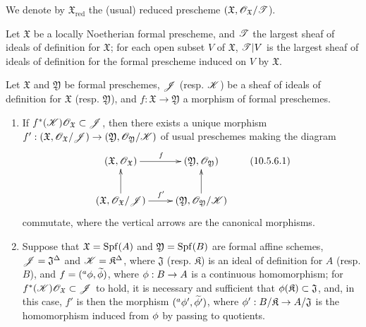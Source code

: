 We denote by $\mathfrak{X}_\text{red}$ the (usual) reduced prescheme $(\mathfrak{X},\mathscr{O}_\mathfrak{X}/\mathscr{T}$).

\begin{corollary}[10.5.5]
\label{1.10.5.5}
Let $\mathfrak{X}$ be a locally Noetherian formal prescheme, and $\mathscr{T}$ the largest sheaf of ideals of definition for $\mathfrak{X}$; for each open subset $V$ of $\mathfrak{X}$, $\mathscr{T}|V$ is the largest sheaf of ideals of definition for the formal prescheme induced on $V$ by $\mathfrak{X}$.
\end{corollary}

\begin{proposition}[10.5.6]
\label{1.10.5.6}
Let $\mathfrak{X}$ and $\mathfrak{Y}$ be formal preschemes, $\mathscr{J}$ (resp. $\mathscr{K}$) be a sheaf of ideals of definition for $\mathfrak{X}$ (resp. $\mathfrak{Y}$), and $f:\mathfrak{X}\to\mathfrak{Y}$ a morphism of formal preschemes.
\begin{enumerate}[label=\emph{(\roman*)}]
  \item If $f^*(\mathscr{K})\mathscr{O}_\mathfrak{X}\subset\mathscr{J}$, then there exists a unique morphism $f':(\mathfrak{X},\sh{O}_\mathfrak{X}/\sh{J})\to(\mathfrak{Y},\sh{O}_\mathfrak{Y}/\sh{K})$ of usual preschemes making the diagram
    \begin{equation*}
    \label{1.10.5.6.1}
      \xymatrix{
        (\mathfrak{X},\sh{O}_\mathfrak{X})\ar[r]^f &
        (\mathfrak{Y},\sh{O}_\mathfrak{Y})\\
        (\mathfrak{X},\sh{O}_\mathfrak{X}/\sh{J})\ar[r]^{f'}\ar[u] &
        (\mathfrak{Y},\sh{O}_\mathfrak{Y}/\sh{K})\ar[u]
      }
      \tag{10.5.6.1}
    \end{equation*}
    commutate, where the vertical arrows are the canonical morphisms.
  \item Suppose that $\mathfrak{X}=\operatorname{Spf}(A)$ and $\mathfrak{Y}=\operatorname{Spf}(B)$ are formal affine schemes, $\mathscr{J}=\mathfrak{J}^\Delta$ and $\mathscr{K}=\mathfrak{K}^\Delta$, where $\mathfrak{J}$ (resp. $\mathfrak{K}$) is an ideal of definition for $A$ (resp. $B$), and $f=({}^a\phi,\widetilde{\phi})$, where $\vphi:B\to A$ is a continuous homomorphism;
    for $f^*(\mathscr{K})\mathscr{O}_\mathfrak{X}\subset\mathscr{J}$ to hold, it is necessary and sufficient that $\phi(\mathfrak{K})\subset\mathfrak{J}$, and, in this case, $f'$ is then the morphism $({}^a\phi',\widetilde{\phi'})$, where $\vphi':B/\mathfrak{K}\to A/\mathfrak{J}$ is the homomorphism induced from $\phi$ by passing to quotients.
\end{enumerate}
\end{proposition}

